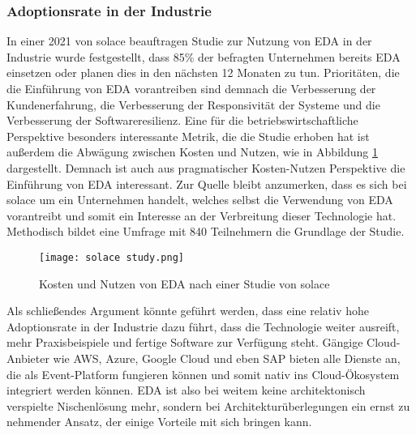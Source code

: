 \subsubsection*{Adoptionsrate in der Industrie}
In einer 2021 von solace beauftragen Studie zur Nutzung von \ac{EDA} in der Industrie wurde festgestellt, dass 85\% der befragten Unternehmen bereits \ac{EDA} einsetzen oder planen dies in den nächsten 12 Monaten zu tun. Prioritäten, die die Einführung von \ac{EDA} vorantreiben sind demnach die Verbesserung der Kundenerfahrung, die Verbesserung der Responsivität der Systeme und die Verbesserung der Softwareresilienz. \cite[Vgl.][]{solace2021} Eine für die betriebswirtschaftliche Perspektive besonders interessante Metrik, die die Studie erhoben hat ist außerdem die Abwägung zwischen Kosten und Nutzen, wie in Abbildung \ref{solace} dargestellt. Demnach ist auch aus pragmatischer Kosten-Nutzen Perspektive die Einführung von \ac{EDA} interessant. Zur Quelle bleibt anzumerken, dass es sich bei solace um ein Unternehmen handelt, welches selbst die Verwendung von \ac{EDA} vorantreibt und somit ein Interesse an der Verbreitung dieser Technologie hat.  Methodisch bildet eine Umfrage mit 840 Teilnehmern die Grundlage der Studie.
\begin{figure}[H]
    \centering
    \texttt{[image: solace study.png]}
    \caption[Kosten Nutzen EDA]{Kosten und Nutzen von EDA nach einer Studie von solace \cite[Vgl.][]{solace2021}}
    \label{solace}
  \end{figure}
Als schließendes Argument könnte geführt werden, dass eine relativ hohe Adoptionsrate in der Industrie dazu führt, dass die Technologie weiter ausreift, mehr Praxisbeispiele und fertige Software zur Verfügung steht. Gängige Cloud-Anbieter wie AWS\cite[Vgl.][]{aws2023}, Azure\cite[Vgl.][]{azure2023}, Google Cloud \cite[Vgl.][]{gcp2021} und eben SAP bieten alle Dienste an, die als Event-Platform fungieren können und somit nativ ins Cloud-Ökosystem integriert werden können. \ac*{EDA} ist also bei weitem keine architektonisch verspielte Nischenlösung mehr, sondern bei Architekturüberlegungen ein ernst zu nehmender Ansatz, der einige Vorteile mit sich bringen kann. 